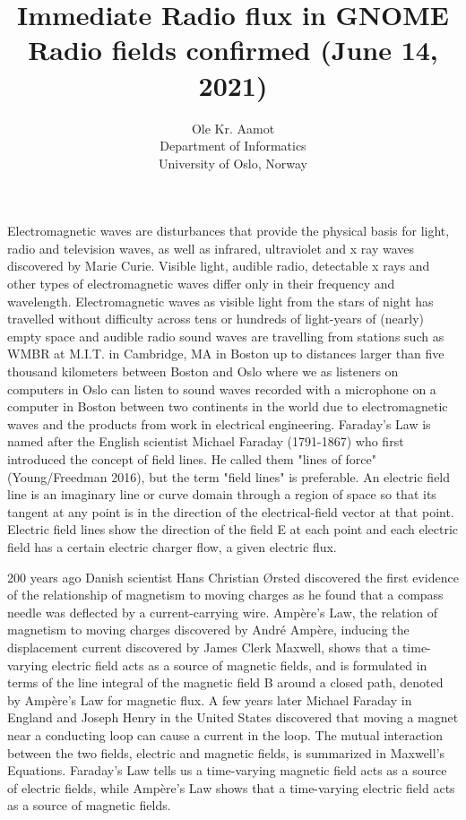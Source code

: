 \documentclass[a4paper]{article}
\author{Ole Kr. Aamot\\
  Department of Informatics\\
  University of Oslo, Norway}
\title{Immediate Radio flux in GNOME Radio fields confirmed (June 14, 2021)}
\begin{document}
\maketitle

Electromagnetic waves are disturbances that provide the physical basis for 
light, radio and television waves, as well as infrared, ultraviolet and x 
ray waves discovered by Marie Curie. Visible light, audible radio, 
detectable x rays and other types of electromagnetic waves differ only in 
their frequency and wavelength. Electromagnetic waves as visible light 
from the stars of night has travelled without difficulty across tens or 
hundreds of light-years of (nearly) empty space and audible radio sound 
waves are travelling from stations such as WMBR at M.I.T. in Cambridge, MA 
in Boston up to distances larger than five thousand kilometers between 
Boston and Oslo where we as listeners on computers in Oslo can listen to 
sound waves recorded with a microphone on a computer in Boston between two 
continents in the world due to electromagnetic waves and the products from 
work in electrical engineering. Faraday's Law is named after the English 
scientist Michael Faraday (1791-1867) who first introduced the concept of 
field lines.  He called them "lines of force" (Young/Freedman 2016), but 
the term "field lines" is preferable. An electric field line is an 
imaginary line or curve domain through a region of space so that its 
tangent at any point is in the direction of the electrical-field vector at 
that point. Electric field lines show the direction of the field E at each 
point and each electric field has a certain electric charger flow, a given 
electric flux.

200 years ago Danish scientist Hans Christian \O{}rsted discovered the first 
evidence of the relationship of magnetism to moving 
charges as he found that a compass needle was deflected by a 
current-carrying wire. Amp\`ere's Law, the relation of magnetism to moving 
charges discovered by Andr\'e Amp\`ere, inducing the displacement current 
discovered by James Clerk Maxwell, shows that a time-varying electric 
field acts as a source of magnetic fields, and is formulated in terms of 
the line integral of the magnetic field B around a closed path, denoted by 
Amp\`ere's Law for magnetic flux. A few years later Michael Faraday in 
England and Joseph Henry in the United States discovered that moving a 
magnet near a conducting loop can cause a current in the loop. The mutual 
interaction between the two fields, electric and magnetic fields, is 
summarized in Maxwell's Equations. Faraday's Law tells us a time-varying 
magnetic field acts as a source of electric fields, while Amp\`ere's Law 
shows that a time-varying electric field acts as a source of magnetic 
fields.
\end{document}
